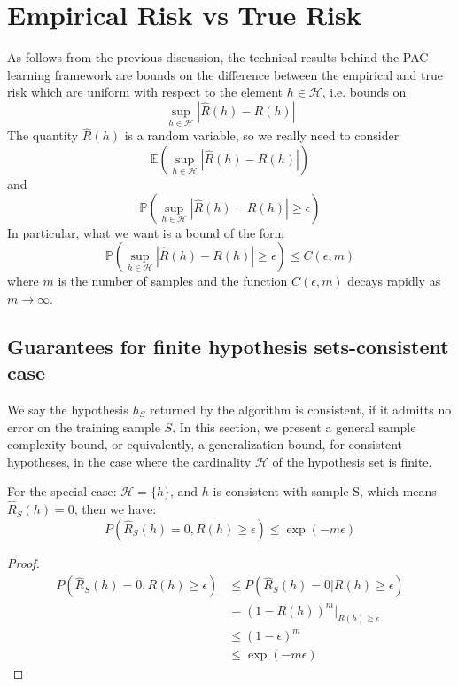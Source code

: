 \section{Empirical Risk vs True Risk}
As follows from the previous discussion, the technical results behind the PAC learning framework are bounds on the difference 
between the empirical and true risk which are uniform with respect to the element $h\in \mathcal{H}$, i.e. bounds on
\begin{equation}
\sup_{h\in \mathcal{H}} |\hat{R}(h) - R(h)|
\end{equation}
The quantity $\hat{R}(h)$ is a random variable, so we really need to consider
\begin{equation}
\mathbb{E}(\sup_{h\in \mathcal{H}} |\hat{R}(h) - R(h)|)
\end{equation}
and
\begin{equation}
\mathbb{P}(\sup_{h\in \mathcal{H}} |\hat{R}(h) - R(h)| \geq \epsilon)
\end{equation}
In particular, what we want is a bound of the form
\begin{equation}
\mathbb{P}(\sup_{h\in \mathcal{H}} |\hat{R}(h) - R(h)| \geq \epsilon) \leq C(\epsilon, m)
\end{equation}
where $m$ is the number of samples and the function $C(\epsilon, m)$ decays rapidly as $m\rightarrow \infty$.

\subsection{Guarantees for finite hypothesis sets-consistent case}
We say the hypothesis $h_S$ returned by the algorithm is consistent, if it admitts no error on
the training sample $S$. In this section, we present a general sample complexity
bound, or equivalently, a generalization bound, for consistent hypotheses, in the
case where the cardinality $\mathcal{H}$ of the hypothesis set is finite.
\begin{lemma}
	For the special case: $\mathcal{H} = \{h\}$, and $h$ is consistent with sample S, which means $\hat{R}_S (h)=0$, then we have:
	$$P \left( \hat{R}_S (h)=0, R(h) \geq \epsilon \right) \leq \exp(-m\epsilon)$$
\end{lemma}
\begin{proof}
	\begin{align}
	P \left( \hat{R}_S (h)=0, R(h) \geq \epsilon \right) &\leq P\left( \hat{R}_S (h)=0 \big| R(h) \geq \epsilon \right) \\
	&= (1-R(h))^m \big|_{R(h) \geq \epsilon} \\
	&\leq (1-\epsilon)^m \\
	&\leq \exp(-m\epsilon) 
	\end{align}
\end{proof}

